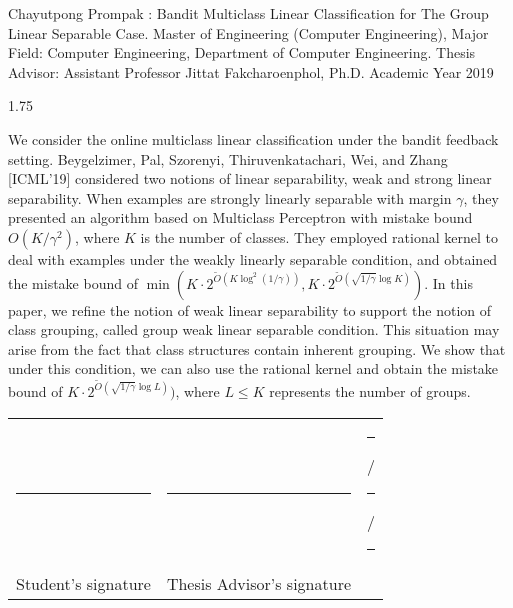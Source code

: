 \justify

\newenvironment{indentabstract}[1]%
{\begin{list}{}%
	{\setlength{\leftmargin}{#1}}%
		\item[]%
	}
{\end{list}}

\begin{indentabstract}{0.5in}
Chayutpong Prompak : Bandit Multiclass Linear Classification for The Group
Linear Separable Case. 
Master of Engineering (Computer Engineering), 
Major Field: Computer Engineering, Department of Computer Engineering. 
Thesis Advisor: Assistant Professor
Jittat Fakcharoenphol, Ph.D. Academic Year 2019
\end{indentabstract}
\begin{spacing}{1.75}
\mbox{}
\end{spacing}

We consider the online multiclass linear classification under the
bandit feedback setting.  Beygelzimer, Pal, Szorenyi,
Thiruvenkatachari, Wei, and Zhang [ICML'19] considered two notions
of linear separability, weak and strong linear separability.  When
examples are strongly linearly separable with margin $\gamma$, they
presented an algorithm based on {\sc Multiclass Perceptron} with
mistake bound $O(K/\gamma^2)$, where $K$ is the number of classes.
They employed rational kernel to deal with examples under the weakly
linearly separable condition, and obtained the mistake bound of
\space\space
$\min(K\cdot 2^{\tilde{O}(K\log^2(1/\gamma))},K\cdot
2^{\tilde{O}(\sqrt{1/\gamma}\log K)})$.  In this paper, we refine
the notion of weak linear separability to support the notion of
class grouping, called group weak linear separable condition.  This
situation may arise from the fact that class structures contain
inherent grouping.  We show that under this condition, we can also
use the rational kernel and obtain the mistake bound of $K\cdot
2^{\tilde{O}(\sqrt{1/\gamma}\log L)})$, where $L\leq K$ represents
the number of groups.
\vspace*{\fill}

\noindent\begin{tabular}{c c c}
	\rule{4.2cm}{0.4pt} & \rule{6.5cm}{0.4pt} & 
	\rule{0.8cm}{0.4pt} / \rule{0.8cm}{0.4pt} / \rule{0.8cm}{0.4pt} \\
	Student's signature & Thesis Advisor's signature
\end{tabular}